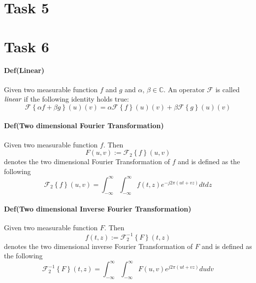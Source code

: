 \documentclass{paper}
\begin{document}
\section*{Task 5}




\section*{Task 6}
\paragraph{Def(Linear)} Given two measurable function $f$ and $g$ and $\alpha$, $\beta \in \mathbb{C}$. An operator $\mathcal{F}$ is called $\emph{linear}$ if the following identity holds true: \\
\begin{equation}
    \mathcal{F} \left \{\alpha f + \beta g \right\}(u)(v) = \alpha \mathcal{F} \left \{f\right\}(u)(v) + \beta \mathcal{F} \left \{g \right\}(u)(v)
\label{eq:lin_op}
\end{equation}

\paragraph{Def(Two dimensional Fourier Transformation)} Given two measurable function $f$. Then
\begin{equation}
    F(u,v) := \mathcal{F}_2 \left \{ f  \right\}(u,v)
\end{equation}
denotes the two dimensional Fourier Transformation of $f$ and is defined as the following \\
\begin{equation}
    \mathcal{F}_2 \left \{ f  \right\}(u,v) = \int_{-\infty}^{\infty} \int_{-\infty}^{\infty} f(t,z) e^{-j 2 \pi (ut+vz)} dt dz
\label{eq:fourier2}
\end{equation}

\paragraph{Def(Two dimensional Inverse Fourier Transformation)} Given two measurable function $F$. Then
\begin{equation}
    f(t,z) := \mathcal{F}^{-1}_{2} \left \{ F  \right\}(t,z)
\end{equation}
denotes the two dimensional inverse Fourier Transformation of $F$ and is defined as the following \\
\begin{equation}
    \mathcal{F}^{-1}_{2} \left \{ F \right\}(t,z) = \int_{-\infty}^{\infty} \int_{-\infty}^{\infty} F(u,v) e^{j 2 \pi (ut+vz)} du dv
\label{eq:fourier2}
\end{equation}
\end{document}
